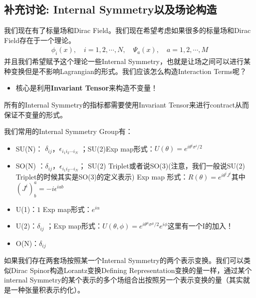\subsection{补充讨论: Internal Symmetry以及场论构造}


我们现在有了标量场和Dirac Field。我们现在希望考虑如果很多的标量场和Dirac Field存在于一个理论。
\begin{align}
  \phi_i(x),\quad i=1,2,\cdots,N, \quad \Psi_a(x),\quad a=1,2,\cdots,M
\end{align}
并且我们希望赋予这个理论一些Internal Symmetry，也就是让场之间可以进行某种变换但是不影响Lagrangian的形式。我们应该怎么构造Interaction Terms呢？
\begin{itemize}
  \item 核心是利用\textbf{Invariant Tensor}来构造不变量！
\end{itemize}
所有的Internal Symmetry的指标都需要使用Invariant Tensor来进行contract从而保证不变量的形式。

\bigskip
{}

我们常用的Internal Symmetry Group有：
\begin{itemize}
  \item SU(N)： $  \delta_{ij} $，$ \epsilon_{i_1 i_2 \cdots i_N} $ ；SU(2)Exp map形式：$  U(\theta) = e^{i\theta^i \sigma^i/2 } $
  \item SO(N) ：$ \delta_{ij} $，$ \epsilon_{i_1 i_2 \cdots i_N} $； SU(2) Triplet或者说SO(3)(注意，我们一般说SU(2) Triplet的时候其实是SO(3)的定义表示) Exp map 形式：$  R(\theta) = e^{i\theta^i J^i } $其中$ (J^i)^a_b = -i\epsilon^{iab} $
  \item U(1)：$ 1 $ Exp map形式：$  e^{i\alpha} $ 
  \item U(2)：$ \delta_{ij} $ ；Exp map形式：$  U(\theta,\phi) = e^{i\theta^\mu \sigma^\mu/2 } e^{i\phi} $这里有一个I的加入！
  \item O(N)：$ \delta_{ij} $ 
\end{itemize}

\bigskip
{}

如果我们存在两套场按照某一个Internal Symmetry的两个表示变换。我们可以类似Dirac Spinor构造Lorantz变换Defining Representation变换的量一样，通过某个internal Symmetry的某个表示的多个场组合出按照另一个表示变换的量（其实就是一种张量积表示约化）。

